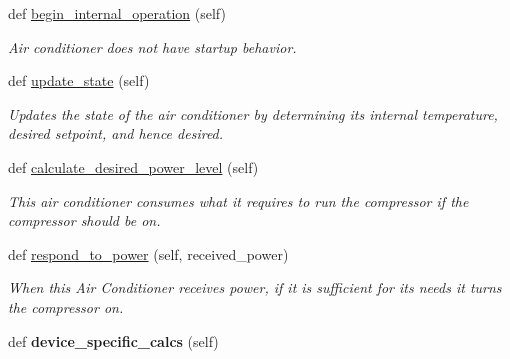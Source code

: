 \begin{DoxyCompactItemize}
\mbox{\label{class_build_1_1_objects_1_1air__conditioner_1_1_air_conditioner_simple_a33d8fdca95127232bd3183d42d83c941}} 
def \hyperlink{class_build_1_1_objects_1_1air__conditioner_1_1_air_conditioner_simple_a33d8fdca95127232bd3183d42d83c941}{begin\+\_\+internal\+\_\+operation} (self)
\begin{DoxyCompactList}\small\item\em Air conditioner does not have startup behavior. \end{DoxyCompactList}\item 
\mbox{\label{class_build_1_1_objects_1_1air__conditioner_1_1_air_conditioner_simple_ae44edec63419de6b2bb9ea0bd93161e0}} 
def \hyperlink{class_build_1_1_objects_1_1air__conditioner_1_1_air_conditioner_simple_ae44edec63419de6b2bb9ea0bd93161e0}{update\+\_\+state} (self)
\begin{DoxyCompactList}\small\item\em Updates the state of the air conditioner by determining its internal temperature, desired setpoint, and hence desired. \end{DoxyCompactList}\item 
def \hyperlink{class_build_1_1_objects_1_1air__conditioner_1_1_air_conditioner_simple_ad127746965293e7973e69a00a701e54d}{calculate\+\_\+desired\+\_\+power\+\_\+level} (self)
\begin{DoxyCompactList}\small\item\em This air conditioner consumes what it requires to run the compressor if the compressor should be on. \end{DoxyCompactList}\item 
def \hyperlink{class_build_1_1_objects_1_1air__conditioner_1_1_air_conditioner_simple_af810a3fced1cc73099a33e4f4020a65e}{respond\+\_\+to\+\_\+power} (self, received\+\_\+power)
\begin{DoxyCompactList}\small\item\em When this Air Conditioner receives power, if it is sufficient for its needs it turns the compressor on. \end{DoxyCompactList}\item 
\mbox{\label{class_build_1_1_objects_1_1air__conditioner_1_1_air_conditioner_simple_a13cb6a7cf5b10f62aaabd50ad902a756}} 
def {\bfseries device\+\_\+specific\+\_\+calcs} (self)
\end{DoxyCompactItemize}
